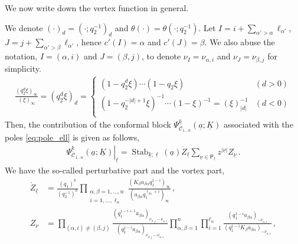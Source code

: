 We now write down the vertex function in general.
\begin{proposition}\label{prop:vort_fn}
We denote $(\cdot)_d = (\cdot;q_2^{-1})_d$ and $\theta(\cdot) = \theta(\cdot;q_2^{-1})$.
Let $I = i + \sum_{\alpha' > \alpha} \ell_{\alpha'}$, $J = j + \sum_{\alpha' > \beta} \ell_{\alpha'}$, hence $c'(I) = \alpha$ and $c'(J) = \beta$.
We also abuse the notation, $I = (\alpha,i)$ and $J = (\beta,j)$, to denote $\nu_I = \nu_{\alpha,i}$ and $\nu_J = \nu_{\beta,j}$ for simplicity.
\begin{align}
    \frac{(q_2^d \xi)_\infty}{(\xi)_\infty} = (q_2^d \xi)_d =
    \begin{cases}
        (1 - q_2^d \xi) \cdots (1 - q_2 \xi) & (d > 0) \\
        (1 - q_2^{-|d|+1} \xi)^{-1} \cdots (1 - \xi)^{-1} = (\xi)_{|d|}^{-1} & (d < 0) \\
    \end{cases}
\end{align}
\fi
    Then, the contribution of the conformal block $\Psi_{\mathscr{C}_{1\ldots n}}^{\underline{k}}(\underline{a};\underline{K})$ associated with the poles \eqref{eq:pole_ell} is given as follows,
\begin{align}
    \left.\Psi_{\mathscr{C}_{1\ldots n}}^{\underline{k}}(\underline{a};\underline{K})\right|_{\underline{\ell}} = \operatorname{Stab}_{\underline{k};\underline{\ell}}(\underline{a}) \mathring{Z}_{\underline{\ell}} \sum_{\underline{\nu} \in \mathsf{P}_{\underline{\ell}}} z^{|\underline{\nu}|} {Z}_{\underline{\nu}}
    \, .
\end{align}
We have the so-called perturbative part and the vortex part,
\begin{subequations}
\begin{align}
    \mathring{Z}_{\underline{\ell}}
    & = 
    \frac{(q_1)^k}{(q_2^{-1})^k} \prod_{\substack{\alpha,\beta=1,\ldots,n \\ i = 1,\ldots,\ell_\alpha}} \frac{(K_\beta a_{\beta\alpha} q_1^{1-i})_\infty}{(a_{\beta\alpha} q_1^{\ell_{\beta\alpha}+i})_\infty}
    \, , \\
    Z_{\underline{\nu}} 
    & = \prod_{(\alpha,i) \neq (\beta,j)}     \frac{(q_1^{j-i+1} a_{\beta\alpha})_{\nu_{\beta,j}-\nu_{\alpha,i}}}{(q_1^{j-i} a_{\beta\alpha})_{\nu_{\beta,j}-\nu_{\alpha,i}}} \prod_{\alpha,\beta=1}^n \prod_{i=1}^{\ell_\alpha} \frac{(q_1^{1-i} a_{\beta \alpha})_{-\nu_{\alpha,i}}}{(q_1^{1-i} K_\beta a_{\beta \alpha})_{-\nu_{\alpha,i}}}
    \, ,
\end{align}
\end{subequations}

\end{proposition}
